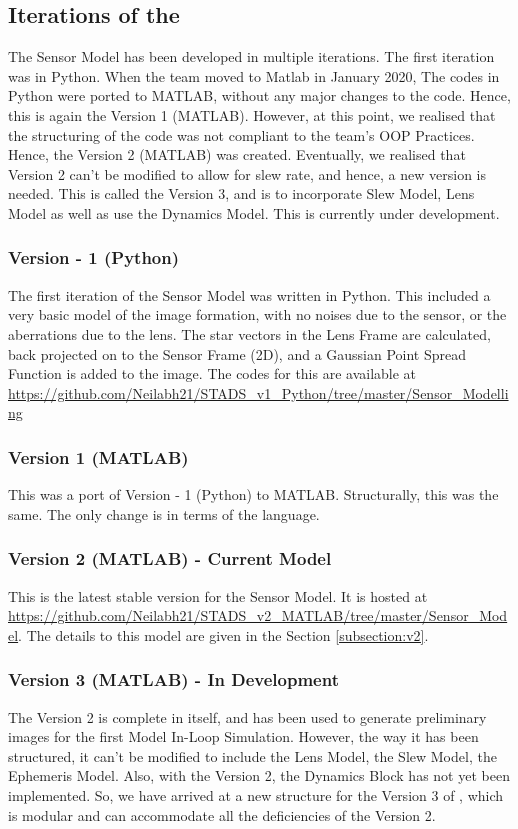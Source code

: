 \documentclass[../../main.tex]{subfiles}
\begin{document}
\subsection{Iterations of the \SISM}
The Sensor Model has been developed in multiple iterations. The first iteration was in Python. When the team moved to Matlab in January 2020, The codes in Python were ported to MATLAB, without any major changes to the code. Hence, this is again the Version 1 (MATLAB). However, at this point, we realised that the structuring of the code was not compliant to the team's OOP Practices. Hence, the Version 2 (MATLAB) was created. Eventually, we realised that Version 2 can't be modified to allow for slew rate, and hence, a new version is needed. This is called the Version 3, and is to incorporate Slew Model, Lens Model as well as use the Dynamics Model. This is currently under development.

\subsubsection{Version - 1 (Python)}
The first iteration of the Sensor Model was written in Python. This included a very basic model of the image formation, with no noises due to the sensor, or the aberrations due to the lens. The star vectors in the Lens Frame are calculated, back projected on to the Sensor Frame (2D), and a Gaussian Point Spread Function is added to the image. The codes for this are available at \url{https://github.com/Neilabh21/STADS_v1_Python/tree/master/Sensor_Modelling}


\subsubsection{Version 1 (MATLAB)}
This was a port of Version - 1 (Python) to MATLAB. Structurally, this was the same. The only change is in terms of the language.

\subsubsection{Version 2 (MATLAB) - Current Model}
This is the latest stable version for the Sensor Model. It is hosted at \url{https://github.com/Neilabh21/STADS_v2_MATLAB/tree/master/Sensor_Model}. The details to this model are given in the Section \ref{subsection:v2}.

\subsubsection{Version 3 (MATLAB) - In Development}
The Version 2 is complete in itself, and has been used to generate preliminary images for the first Model In-Loop Simulation. However, the way it has been structured, it can't be modified to include the Lens Model, the Slew Model, the Ephemeris Model. Also, with the Version 2, the Dynamics Block has not yet been implemented. So, we have arrived at a new structure for the Version 3 of \SISM, which is modular and can accommodate all the deficiencies of the Version 2.
\end{document}
